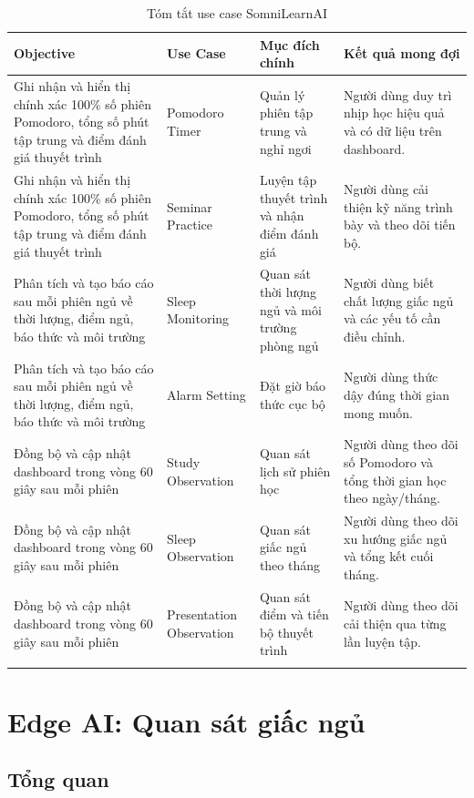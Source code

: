 \documentclass[12pt,a4paper]{article}
\begin{document}
\begin{longtable}{|P{3.3cm}|P{3cm}|P{3.3cm}|P{4.2cm}|}
\hline
\textbf{Objective} & \textbf{Use Case} & \textbf{Mục đích chính} & \textbf{Kết quả mong đợi} \\
\hline
Ghi nhận và hiển thị chính xác 100\% số phiên Pomodoro, tổng số phút tập trung và điểm đánh giá thuyết trình & Pomodoro Timer & Quản lý phiên tập trung và nghỉ ngơi & Người dùng duy trì nhịp học hiệu quả và có dữ liệu trên dashboard. \\
\hline
Ghi nhận và hiển thị chính xác 100\% số phiên Pomodoro, tổng số phút tập trung và điểm đánh giá thuyết trình & Seminar Practice & Luyện tập thuyết trình và nhận điểm đánh giá & Người dùng cải thiện kỹ năng trình bày và theo dõi tiến bộ. \\
\hline
Phân tích và tạo báo cáo sau mỗi phiên ngủ về thời lượng, điểm ngủ, báo thức và môi trường & Sleep Monitoring & Quan sát thời lượng ngủ và môi trường phòng ngủ & Người dùng biết chất lượng giấc ngủ và các yếu tố cần điều chỉnh. \\
\hline
Phân tích và tạo báo cáo sau mỗi phiên ngủ về thời lượng, điểm ngủ, báo thức và môi trường & Alarm Setting & Đặt giờ báo thức cục bộ & Người dùng thức dậy đúng thời gian mong muốn. \\
\hline
Đồng bộ và cập nhật dashboard trong vòng 60 giây sau mỗi phiên & Study Observation & Quan sát lịch sử phiên học & Người dùng theo dõi số Pomodoro và tổng thời gian học theo ngày/tháng. \\
\hline
Đồng bộ và cập nhật dashboard trong vòng 60 giây sau mỗi phiên & Sleep Observation & Quan sát giấc ngủ theo tháng & Người dùng theo dõi xu hướng giấc ngủ và tổng kết cuối tháng. \\
\hline
Đồng bộ và cập nhật dashboard trong vòng 60 giây sau mỗi phiên & Presentation Observation & Quan sát điểm và tiến bộ thuyết trình & Người dùng theo dõi cải thiện qua từng lần luyện tập. \\
\hline
\caption{Tóm tắt use case SomniLearnAI}
\end{longtable}

\newpage
\section{Edge AI: Quan sát giấc ngủ}

\subsection{Tổng quan}
\end{document}
